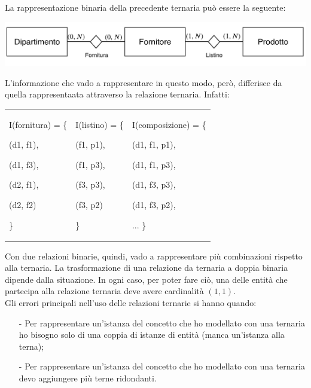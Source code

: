 \documentclass[a4paper, 10pt]{report}
\begin{document}
\noindent La rappresentazione binaria della precedente ternaria può essere la seguente: 

\begin{center}
\includegraphics[scale=0.5]{22ottobre01.pdf}
\end{center}

\noindent L'informazione che vado a rappresentare in questo modo, però, differisce da quella rappresentaata attraverso la relazione ternaria. Infatti:

\begin{longtable}{ p{} p{} p{}}

I(fornitura) = \{

(d1, f1), 

(d1, f3), 

(d2, f1), 

(d2, f2)

\} & I(listino) = \{

(f1, p1), 

(f1, p3), 

(f3, p3), 

(f3, p2)

\} & I(composizione) = \{

(d1, f1, p1), 

(d1, f1, p3), 

(d1, f3, p3), 

(d1, f3, p2), 

...
\}
\end{longtable}

\noindent Con due relazioni binarie, quindi, vado a rappresentare più combinazioni rispetto alla ternaria. La trasformazione di una relazione da ternaria a doppia binaria dipende dalla situazione. In ogni caso, per poter fare ciò, una delle entità che partecipa alla relazione ternaria deve avere cardinalità $(1, 1)$.\\

\noindent Gli errori principali nell'uso delle relazioni ternarie si hanno quando:
\begin{itemize}
\item[-] Per rappresentare un'istanza del concetto che ho modellato con una ternaria ho bisogno solo di una coppia di istanze di entità (manca un'istanza alla terna);
\item[-] Per rappresentare un'istanza del concetto che ho modellato con una ternaria devo aggiungere più terne ridondanti.  
\end{itemize}
\end{document}

